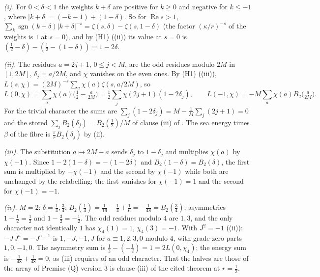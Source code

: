 \emph{(i).} For $0 < \delta < 1$ the weights $k + \delta$ are positive for $k \ge 0$ and negative for $k \le -1$, where $|k + \delta| = (-k - 1) + (1 - \delta)$. So for $\operatorname{Re}s > 1$, $\sum_{k}\operatorname{sgn}(k + \delta)|k + \delta|^{-s} = \zeta(s, \delta) - \zeta(s, 1 - \delta)$ (the factor $(\kappa/r)^{-s}$ of the weights is $1$ at $s = 0$), and by (H1) ((ii)) its value at $s = 0$ is $(\tfrac12 - \delta) - (\tfrac12 - (1 - \delta)) = 1 - 2\delta$.

\emph{(ii).} The residues $a = 2j + 1$, $0 \le j < M$, are the odd residues modulo $2M$ in $[1, 2M]$, $\delta_{j} = a/2M$, and $\chi$ vanishes on the even ones. By (H1) ((iii)), $L(s, \chi) = (2M)^{-s}\sum_{a}\chi(a)\zeta(s, a/2M)$, so
\[
L(0, \chi) = \sum_{a}\chi(a)\bigl(\tfrac12 - \tfrac{a}{2M}\bigr) = \tfrac12\sum_{j}\chi(2j+1)(1 - 2\delta_{j}), \qquad L(-1, \chi) = -M\sum_{a}\chi(a)B_{2}\bigl(\tfrac{a}{2M}\bigr).
\]
For the trivial character the sums are $\sum_{j}(1 - 2\delta_{j}) = M - \tfrac{1}{M}\sum_{j}(2j+1) = 0$ and the stored $\sum_{j}B_{2}(\delta_{j}) = B_{2}(\tfrac12)/M$ of clause (iii) of . The sea energy times $\beta$ of the fibre is $\tfrac{\pi}{r}B_{2}(\delta_{j})$ by (ii).

\emph{(iii).} The substitution $a \mapsto 2M - a$ sends $\delta_{j}$ to $1 - \delta_{j}$ and multiplies $\chi(a)$ by $\chi(-1)$. Since $1 - 2(1 - \delta) = -(1 - 2\delta)$ and $B_{2}(1 - \delta) = B_{2}(\delta)$, the first sum is multiplied by $-\chi(-1)$ and the second by $\chi(-1)$ while both are unchanged by the relabelling: the first vanishes for $\chi(-1) = 1$ and the second for $\chi(-1) = -1$.

\emph{(iv).} $M = 2$: $\delta = \tfrac14, \tfrac34$; $B_{2}(\tfrac14) = \tfrac1{16} - \tfrac14 + \tfrac16 = -\tfrac1{48} = B_{2}(\tfrac34)$; asymmetries $1 - \tfrac12 = \tfrac12$ and $1 - \tfrac32 = -\tfrac12$. The odd residues modulo $4$ are $1, 3$, and the only character not identically $1$ has $\chi_{4}(1) = 1$, $\chi_{4}(3) = -1$. With $J^{2} = -1$ ((ii)): $-J\,J^{a} = -J^{a+1}$ is $1, -J, -1, J$ for $a \equiv 1, 2, 3, 0$ modulo $4$, with grade-zero parts $1, 0, -1, 0$. The asymmetry sum is $\tfrac12 - (-\tfrac12) = 1 = 2L(0, \chi_{4})$; the energy sum is $-\tfrac1{48} + \tfrac1{48} = 0$, as (iii) requires of an odd character. That the halves are those of the array of Premise (Q) version 3 is clause (iii) of the cited theorem at $r = \tfrac12$.

